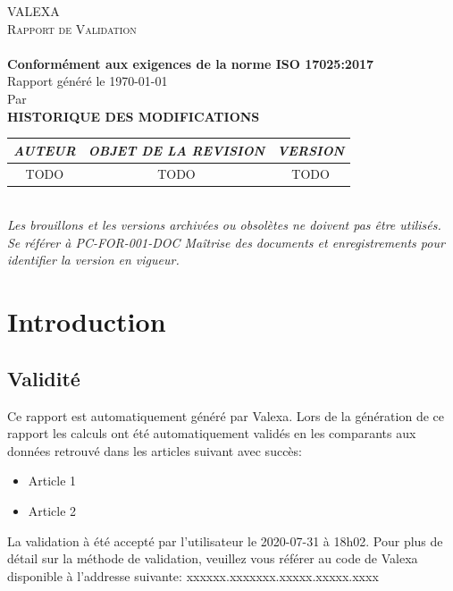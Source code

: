 \documentclass[letterpaper]{article}
\renewcommand{\arraystretch}{1.5} %
\begin{document}
\centering
\textsc{\huge VALEXA}\\
\vspace{10mm}
\textsc{\LARGE Rapport de Validation}\\
\vspace{10mm}
{\huge \PCMATNAME}\\
\smallskip
\textbf{Conformément aux exigences de la norme ISO 17025:2017}\\
\vspace{10mm}
{Rapport généré le \today}\\
{Par \AUTEUR}\\
\vspace{10mm}
\textbf{HISTORIQUE DES MODIFICATIONS}\vspace{5mm}
\begingroup
    \setlength{\tabcolsep}{10pt} %
    \renewcommand{\arraystretch}{2.5} %
    \begin{tabular}{|c|c|c|}
        \hline
        \textit{\textbf{AUTEUR}}
         &
         \textit{\textbf{OBJET DE LA REVISION}}
         &
         \textit{\textbf{VERSION}}\\[2mm]
         \hline
         TODO
         &
         TODO
         &
         TODO\\[2mm]
         \hline
    \end{tabular}\\
\endgroup
\vspace{10mm}
\textit{Les brouillons et les versions archivées ou obsolètes ne doivent pas être utilisés.
Se référer à PC-FOR-001-DOC Maîtrise des documents et enregistrements
pour identifier la version en vigueur.}
\newpage
\tableofcontents

\newpage

\section{Introduction}
\subsection{Validité}
Ce rapport est automatiquement généré par Valexa. Lors de la génération de ce rapport les calculs ont été automatiquement validés en les comparants aux données retrouvé dans les articles suivant avec succès:\par
\begin{itemize}
\item Article 1
\item Article 2
\end{itemize}
La validation à été accepté par l'utilisateur le 2020-07-31 à 18h02. Pour plus de détail sur la méthode de validation, veuillez vous référer au code de Valexa disponible à l'addresse suivante: xxxxxx.xxxxxxx.xxxxx.xxxxx.xxxx
\end{document}
